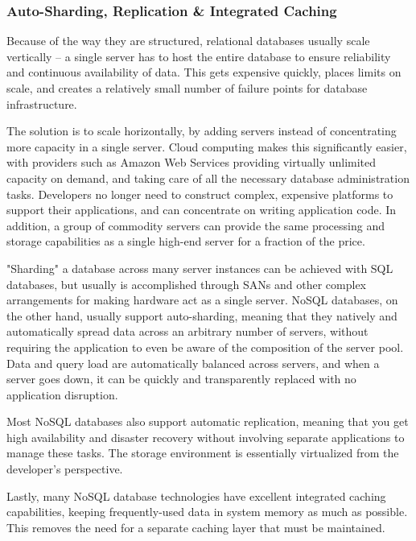 \documentclass[12pt]{article}
\begin{document}
\subsubsection{Auto-Sharding, Replication \& Integrated Caching}

Because of the way they are structured, relational databases usually scale vertically – a single server has to host the entire database to ensure reliability and continuous availability of data. This gets expensive quickly, places limits on scale, and creates a relatively small number of failure points for database infrastructure.

The solution is to scale horizontally, by adding servers instead of concentrating more capacity in a single server. Cloud computing makes this significantly easier, with providers such as Amazon Web Services providing virtually unlimited capacity on demand, and taking care of all the necessary database administration tasks. Developers no longer need to construct complex, expensive platforms to support their applications, and can concentrate on writing application code. In addition, a group of commodity servers can provide the same processing and storage capabilities as a single high-end server for a fraction of the price.

"Sharding" a database across many server instances can be achieved with SQL databases, but usually is accomplished through SANs and other complex arrangements for making hardware act as a single server. NoSQL databases, on the other hand, usually support auto-sharding, meaning that they natively and automatically spread data across an arbitrary number of servers, without requiring the application to even be aware of the composition of the server pool. Data and query load are automatically balanced across servers, and when a server goes down, it can be quickly and transparently replaced with no application disruption.

Most NoSQL databases also support automatic replication, meaning that you get high availability and disaster recovery without involving separate applications to manage these tasks. The storage environment is essentially virtualized from the developer's perspective.

Lastly, many NoSQL database technologies have excellent integrated caching capabilities, keeping frequently-used data in system memory as much as possible. This removes the need for a separate caching layer that must be maintained.
\end{document}

